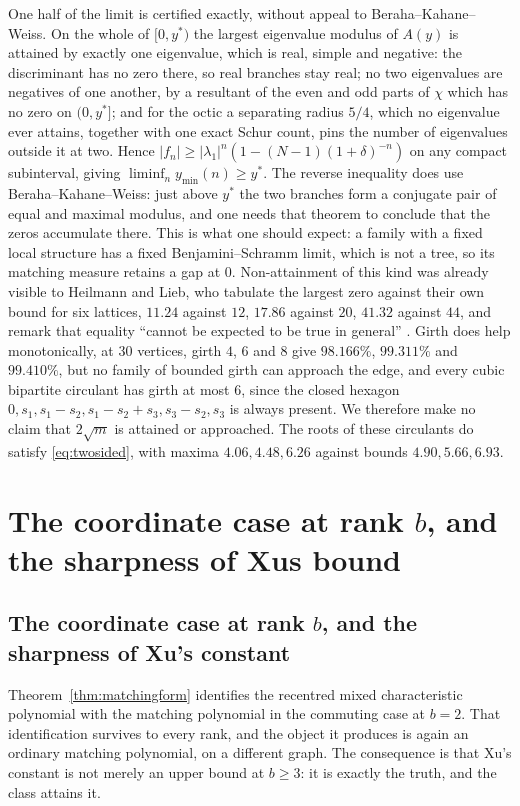 \documentclass[11pt]{article}
\theoremstyle{remark}
\begin{document}
One half of the limit is certified exactly, without appeal to
Beraha--Kahane--Weiss. On the whole of $[0,y^*)$ the largest eigenvalue modulus of
$A(y)$ is attained by exactly one eigenvalue, which is real, simple and negative:
the discriminant has no zero there, so real branches stay real; no two eigenvalues
are negatives of one another, by a resultant of the even and odd parts of $\chi$
which has no zero on $(0,y^*]$; and for the octic a separating radius $5/4$, which
no eigenvalue ever attains, together with one exact Schur count, pins the number of
eigenvalues outside it at two. Hence $|f_n|\ge|\lambda_1|^n(1-(N-1)(1+\delta)^{-n})$
on any compact subinterval, giving $\liminf_ny_{\min}(n)\ge y^*$. The reverse
inequality does use Beraha--Kahane--Weiss: just above $y^*$ the two branches form a
conjugate pair of equal and maximal modulus, and one needs that theorem to conclude
that the zeros accumulate there. This is what one should expect:
a family with a fixed local structure has a fixed Benjamini--Schramm limit, which
is not a tree, so its matching measure retains a gap at $0$. Non-attainment of
this kind was already visible to Heilmann and Lieb, who tabulate the largest zero
against their own bound for six lattices, $11.24$ against $12$, $17.86$ against
$20$, $41.32$ against $44$, and remark that equality ``cannot be expected to be
true in general'' \cite[Table 1 and Remark 4.3]{HL}. Girth does help
monotonically, at $30$ vertices, girth $4$, $6$ and $8$ give $98.166\%$,
$99.311\%$ and $99.410\%$, but no family of bounded girth can approach the
edge, and every cubic bipartite circulant has girth at most $6$, since the closed
hexagon $0,s_1,s_1-s_2,s_1-s_2+s_3,s_3-s_2,s_3$ is always present. We therefore
make no claim that $2\sqrt m$ is attained or approached. The roots of these
circulants do satisfy \eqref{eq:twosided}, with maxima $4.06,4.48,6.26$ against
bounds $4.90,5.66,6.93$.


\section{The coordinate case at rank $b$, and the sharpness of Xus bound}

\subsection{The coordinate case at rank \texorpdfstring{$b$}{b}, and the sharpness of Xu's
constant}\label{sec:xusharp}

Theorem~\ref{thm:matchingform} identifies the recentred mixed characteristic polynomial with the
matching polynomial in the commuting case at $b=2$. That identification survives to every rank,
and the object it produces is again an ordinary matching polynomial, on a different graph. The
consequence is that Xu's constant is not merely an upper bound at $b\ge3$: it is exactly the
truth, and the class attains it.
\end{document}
